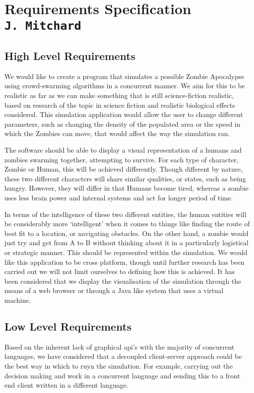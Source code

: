 \pagestyle{empty}

\section{Requirements Specification\\{\small\tt J.~Mitchard}}
\subsection{High Level Requirements}
We would like to create a program that simulates a possible Zombie Apocalypse using crowd-swarming algorithms in a concurrent manner. We aim for this to be realistic as far as we can make something that is still science-fiction realistic, based on research of the topic in science fiction and realistic biological effects considered. This simulation application would allow the user to change different parameters, such as changing the density of the populated area or the speed in which the Zombies can move, that would affect the way the simulation ran. 

The software should be able to display a visual representation of a humans and zombies swarming together, attempting to survive. For each type of character, Zombie or Human, this will be achieved differently. Though different by nature, these two different characters will share similar qualities, or states, such as being hungry. However, they will differ in that Humans become tired, whereas a zombie uses less brain power and internal systems and act for longer period of time.

In terms of the intelligence of these two different entities, the human entities will be considerably more ‘intelligent’ when it comes to things like finding the route of best fit to a location, or navigating obstacles. On the other hand, a zombie would just try and get from A to B without thinking about it in a particularly logistical or strategic manner. This should be represented within the simulation.
We would like this application to be cross platform, though until further research has been carried out we will not limit ourselves to defining how this is achieved. It has been considered that we display the visualisation of the simulation through the means of a web browser or through a Java like system that uses a virtual machine.
\subsection{Low Level Requirements}
Based on the inherent lack of graphical api’s with the majority of concurrent languages, we have considered that a decoupled client-server approach could be the best way in which to ruyn the simulation. For example, carrying out the decision making and work in a concurrent language and sending this to a front end client written in a different language.

